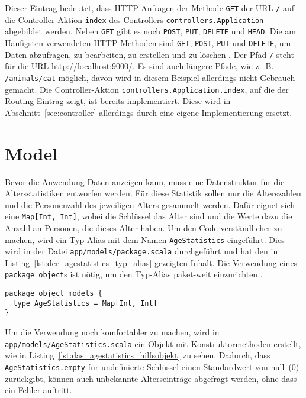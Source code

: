Dieser Eintrag bedeutet, dass HTTP-Anfragen der Methode \lstinline|GET| der URL \lstinline|/| auf die Controller-Aktion \lstinline|index| des Controllers \lstinline[breaklines=true]|controllers.Application| abgebildet werden.
Neben \lstinline|GET| gibt es noch \lstinline|POST|, \lstinline|PUT|, \lstinline|DELETE| und \lstinline|HEAD|.
Die am Häufigsten verwendeten HTTP-Methoden sind \lstinline|GET|, \lstinline|POST|, \lstinline|PUT| und \lstinline|DELETE|, um Daten abzufragen, zu bearbeiten, zu erstellen und zu löschen \cite[vgl.][S.~6]{play_for_scala_v8}.
Der Pfad \lstinline|/| steht für die URL \url{http://localhost:9000/}.
Es sind auch längere Pfade, wie z.~B. \lstinline|/animals/cat| möglich, davon wird in diesem Beispiel allerdings nicht Gebrauch gemacht.
Die Controller-Aktion \lstinline|controllers.Application.index|, auf die der Routing-Eintrag zeigt, ist bereits implementiert.
Diese wird in Abschnitt~\ref{sec:controller} allerdings durch eine eigene Implementierung ersetzt.



\section{Model} %
\label{sec:model}

Bevor die Anwendung Daten anzeigen kann, muss eine Datenstruktur für die Altersstatistiken entworfen werden.
Für diese Statistik sollen nur die Alterszahlen und die Personenzahl des jeweiligen Alters gesammelt werden.
Dafür eignet sich eine \lstinline|Map[Int, Int]|, wobei die Schlüssel das Alter sind und die Werte dazu die Anzahl an Personen, die dieses Alter haben.
Um den Code verständlicher zu machen, wird ein Typ-Alias mit dem Namen \lstinline|AgeStatistics| eingeführt.
Dies wird in der Datei \lstinline[language=sh]|app/models/package.scala| durchgeführt und hat den in Listing~\ref{lst:der_agestatistics_typ_alias} gezeigten Inhalt.
Die Verwendung eines \lstinline|package object|s ist nötig, um den Typ-Alias paket-weit einzurichten \cite[vgl.][]{package_objects}.

\begin{lstlisting}[caption=Der AgeStatistics-Typ-Alias, label=lst:der_agestatistics_typ_alias]
package object models {
  type AgeStatistics = Map[Int, Int]
}
\end{lstlisting}

Um die Verwendung noch komfortabler zu machen, wird in \lstinline|app/models/AgeStatistics.scala| ein Objekt mit Konstruktormethoden erstellt, wie in Listing~\ref{lst:das_agestatistics_hilfsobjekt} zu sehen.
Dadurch, dass \lstinline|AgeStatistics.empty| für undefinierte Schlüssel einen Standardwert von null~(0) zurückgibt, können auch unbekannte Alterseinträge abgefragt werden, ohne dass ein Fehler auftritt.

